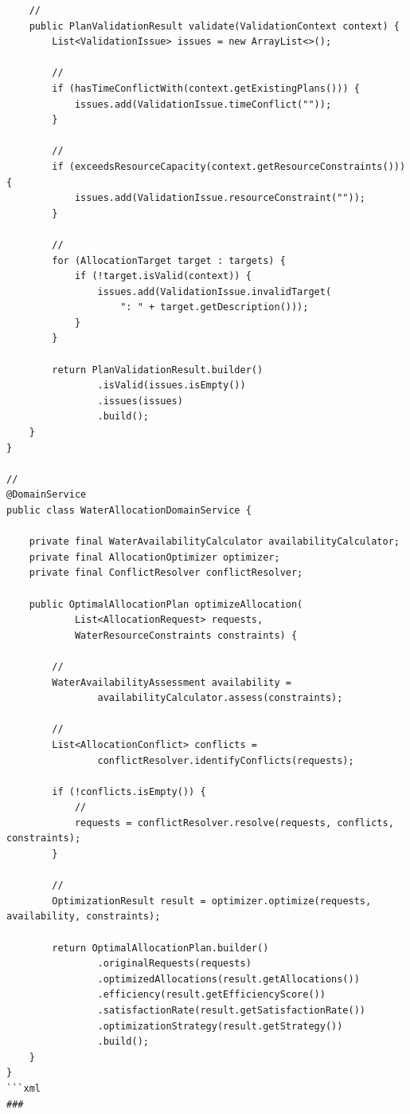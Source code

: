 \begin{verbatim}
    // 
    public PlanValidationResult validate(ValidationContext context) {
        List<ValidationIssue> issues = new ArrayList<>();
        
        // 
        if (hasTimeConflictWith(context.getExistingPlans())) {
            issues.add(ValidationIssue.timeConflict(""));
        }
        
        // 
        if (exceedsResourceCapacity(context.getResourceConstraints())) {
            issues.add(ValidationIssue.resourceConstraint(""));
        }
        
        // 
        for (AllocationTarget target : targets) {
            if (!target.isValid(context)) {
                issues.add(ValidationIssue.invalidTarget(
                    ": " + target.getDescription()));
            }
        }
        
        return PlanValidationResult.builder()
                .isValid(issues.isEmpty())
                .issues(issues)
                .build();
    }
}

// 
@DomainService
public class WaterAllocationDomainService {
    
    private final WaterAvailabilityCalculator availabilityCalculator;
    private final AllocationOptimizer optimizer;
    private final ConflictResolver conflictResolver;
    
    public OptimalAllocationPlan optimizeAllocation(
            List<AllocationRequest> requests, 
            WaterResourceConstraints constraints) {
        
        // 
        WaterAvailabilityAssessment availability = 
                availabilityCalculator.assess(constraints);
        
        // 
        List<AllocationConflict> conflicts = 
                conflictResolver.identifyConflicts(requests);
        
        if (!conflicts.isEmpty()) {
            // 
            requests = conflictResolver.resolve(requests, conflicts, constraints);
        }
        
        // 
        OptimizationResult result = optimizer.optimize(requests, availability, constraints);
        
        return OptimalAllocationPlan.builder()
                .originalRequests(requests)
                .optimizedAllocations(result.getAllocations())
                .efficiency(result.getEfficiencyScore())
                .satisfactionRate(result.getSatisfactionRate())
                .optimizationStrategy(result.getStrategy())
                .build();
    }
}
```xml
### 


\end{verbatim}
